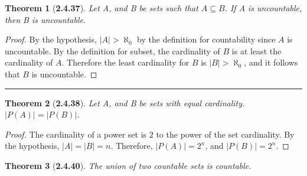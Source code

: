 \documentclass[a4paper, 12pt]{article}
\theoremstyle{plain}
\newtheorem*{theorem*}{Theorem}
\begin{document}
\begin{theorem*}[\textbf{2.4.37}]
    Let A, and B be sets such that $A \subseteq B$. If A is \newline uncountable, then B is 
    uncountable.
\end{theorem*}

\begin{proof}
    By the hypothesis, $|A| > \aleph_0$ by the definition for countability since $A$ is 
    uncountable. By the definition for subset, the cardinality of $B$ is at least the cardinality 
    of $A$. Therefore the least cardinality for $B$ is $|B| > \aleph_0$, and it follows that $B$ 
    is uncountable.
\end{proof}
\begin{center}
    \rule{5.4in}{1pt}
\end{center}


\begin{theorem*}[\textbf{2.4.38}]
    Let A, and B be sets with equal cardinality. \newline $|P(A)| = |P(B)|$. 
\end{theorem*}

\begin{proof}
    The cardinality of a power set is $2$ to the power of the set cardinality. By the hypothesis, $|A| = |B| = n$. Therefore, $|P(A)| = 2^{n}$, and \newline $|P(B)| = 2^{n}$.
\end{proof}

\pagebreak


\begin{theorem*}[\textbf{2.4.40}]
    The union of two countable sets is countable.
\end{theorem*}
\end{document}
